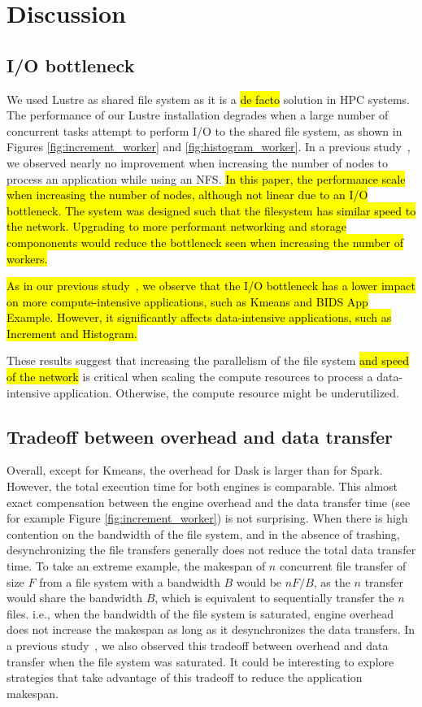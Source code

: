 \documentclass[AMA,STIX1COL]{WileyNJD-v2}
\newcommand{\HL}[1]{\hl{#1}}
\begin{document}
\section{Discussion}
\subsection{I/O bottleneck}
\label{subsec:io-bottleneck}
We used Lustre as shared file system as it is a \HL{de facto} solution in HPC systems.
The performance of our Lustre installation degrades when a large number of concurrent tasks attempt to perform I/O to the shared file system, as shown in Figures \ref{fig:increment_worker} and \ref{fig:histogram_worker}.
In a previous study~\cite{8943502}, we observed nearly no improvement when increasing the number of nodes to process an application while using an NFS.
\HL{In this paper, the performance scale when increasing the number of nodes, although not linear due to an I/O bottleneck.
	The system was designed such that the filesystem has similar speed to the network.
Upgrading to more performant networking and storage compononents would reduce the bottleneck seen when increasing the number of workers.}
				
\HL{
	As in our previous study~{\cite{8943502}}, we observe that the I/O bottleneck has a lower impact on more compute-intensive applications, such as Kmeans and BIDS App Example.
	However, it significantly affects data-intensive applications, such as Increment and Histogram.
}
										
These results suggest that increasing the parallelism of the file system \HL{and speed of the network} is critical when scaling the compute resources to process a data-intensive application.
Otherwise, the compute resource might be underutilized.
										
\subsection{Tradeoff between overhead and data transfer}
\label{subsec:overhead-tradeoff}
Overall, except for Kmeans, the overhead for Dask is larger than for Spark.
However, the total execution time for both engines is comparable.
This almost exact compensation between the engine overhead and the data transfer time (see for example Figure \ref{fig:increment_worker}) is not surprising.
When there is high contention on the bandwidth of the file system, and in the absence of trashing, desynchronizing the file transfers generally does not reduce the total data transfer time.
To take an extreme example, the makespan of $n$ concurrent file transfer of size $F$ from a file system with a bandwidth $B$ would be $nF/B$,
as the $n$ transfer would share the bandwidth $B$, which is equivalent to sequentially transfer the $n$ files.
i.e., when the bandwidth of the file system is saturated, engine overhead does not increase the makespan as long as it desynchronizes the data transfers.
In a previous study~\cite{8943502}, we also observed this tradeoff between overhead and data transfer when the file system was saturated.
It could be interesting to explore strategies that take advantage of this tradeoff to reduce the application makespan.
										
\end{document}
